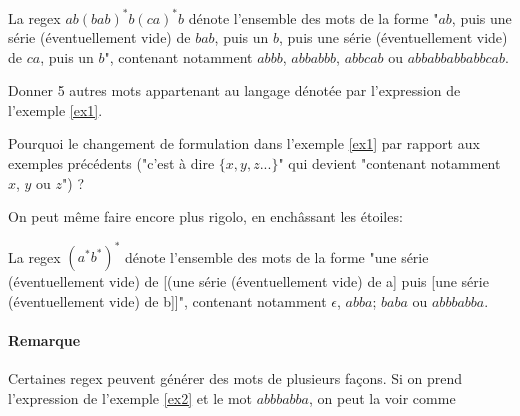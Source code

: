 \begin{example}
\label{ex1}
La regex $ab(bab)^*b(ca)^*b$ dénote l'ensemble des mots de la forme "$ab$, puis une série (éventuellement vide) de $bab$, puis un $b$, puis une série (éventuellement vide) de $ca$, puis un $b$", contenant notamment $abbb$, $abbabbb$, $abbcab$ ou $abbabbabbabbcab$.
\end{example}

\begin{exercice}
Donner 5 autres mots appartenant au langage dénotée par l'expression de l'exemple \ref{ex1}. 
\end{exercice}

\begin{exercice}
Pourquoi le changement de formulation dans l'exemple \ref{ex1} par rapport aux exemples précédents ("c'est à dire $\{x, y, z ... \}$" qui devient "contenant notamment $x$, $y$ ou $z$") ?
\end{exercice}

On peut même faire encore plus rigolo, en enchâssant les étoiles:


\begin{example}
\label{ex2}
La regex $(a^*b^*)^*$ dénote l'ensemble des mots de la forme "une série (éventuellement vide) de [(une série (éventuellement vide) de a] puis [une série (éventuellement vide) de b]]", contenant notamment $\epsilon$, $abba$; $baba$ ou $abbbabba$. 
\end{example}

\paragraph{Remarque} Certaines regex peuvent générer des mots de plusieurs façons. Si on prend l'expression de l'exemple \ref{ex2} et le mot $abbbabba$, on peut la voir comme 

